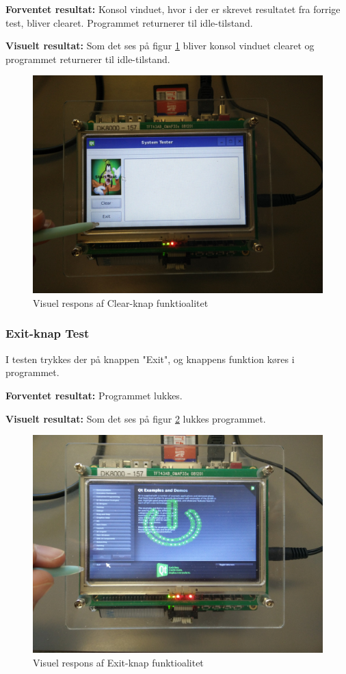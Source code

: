 \noindent\textbf{Forventet resultat:}\newline
Konsol vinduet, hvor i der er skrevet resultatet fra forrige test, bliver clearet. Programmet returnerer til idle-tilstand.\newline

\noindent\textbf{Visuelt resultat:}\newline
\noindent Som det ses på figur \ref{fig:GUIClear} bliver konsol vinduet clearet og programmet returnerer til idle-tilstand.\newline

\begin{figure}[H]
	\centering
	\includegraphics[width=.5\textwidth]{Test/images/GUITest/TestClear.jpg}
	\caption{Visuel respons af Clear-knap funktioalitet}
	\label{fig:GUIClear}
\end{figure}

\subsubsection{Exit-knap Test}
I testen trykkes der på knappen "Exit", og knappens funktion køres i programmet.\newline

\noindent\textbf{Forventet resultat:}\newline
\noindent Programmet lukkes.\newline

\noindent\textbf{Visuelt resultat:}\newline
Som det ses på figur \ref{fig:GUIExit} lukkes programmet.

\begin{figure}[H]
	\centering
	\includegraphics[width=.5\textwidth]{Test/images/GUITest/TestExit.jpg}
	\caption{Visuel respons af Exit-knap funktioalitet}
	\label{fig:GUIExit}
\end{figure}

